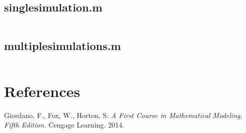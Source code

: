\documentclass{article}
\begin{document}
    \subsection*{singlesimulation.m}
    \inputminted[linenos,breaklines]{matlab}{singlesimulation.m}
    \subsection*{multiplesimulations.m}
    \inputminted[linenos,breaklines]{matlab}{multiplesimulations.m}
    \pagebreak
    \section*{References}
    Giordano, F., Fox, W., Horton, S. \emph{A First Course in Mathematical Modeling, Fifth Edition.} Cengage Learning. 2014.
\end{document}
